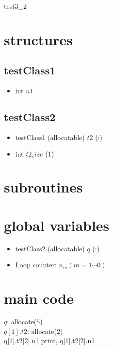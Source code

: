 \documentclass[a4paper,fleqn]{ltjsarticle}
\begin{document}
{\Large test3\_2}

\section{structures}
\subsection{testClass1}\begin{itemize}
  \item int $n1$
\end{itemize}
\subsection{testClass2}\begin{itemize}
  \item testClass1 (allocatable) $t2$ (:)
  \item int $t2_size$ (1)
\end{itemize}
\section{subroutines}
\section{global variables}
\begin{itemize}
\item testClass2 (allocatable) $q$ (:)
\item Loop counter: \(n_m (m = 1 \cdots 0)\)
\end{itemize}
\section{main code}
$q$: allocate($5$)\\
$q[1].t2$: allocate($2$)\\
q[1].t2[2].n1 
print, q[1].t2[2].n1
\end{document}
